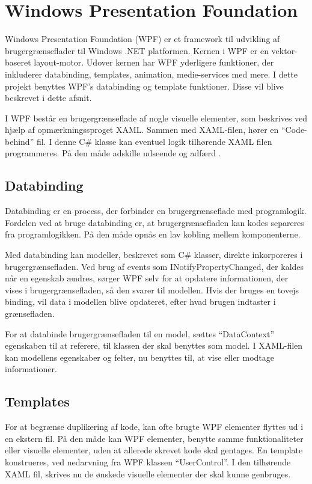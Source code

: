 \section{Windows Presentation Foundation}
\label{sec:wpf}

Windows Presentation Foundation (WPF) er et framework til udvikling af brugergrænseflader til Windows .NET platformen. Kernen i WPF er en vektor-baseret layout-motor. Udover kernen har WPF yderligere funktioner, der inkluderer databinding, templates, animation, medie-services med mere. I dette projekt benyttes WPF's databinding og template funktioner. Disse vil blive beskrevet i dette afsnit.

I WPF består en brugergrænseflade af nogle visuelle elementer, som beskrives ved hjælp af opmærkningssproget XAML. Sammen med XAML-filen, hører en \enquote{Code-behind} fil. I denne C\# klasse kan eventuel logik tilhørende XAML filen programmeres. På den måde adskille udseende og adfærd \cite{microsoft_wpf}.

\subsection{Databinding}

Databinding er en process, der forbinder en brugergrænseflade med programlogik. Fordelen ved at bruge databinding er, at brugergrænsefladen kan kodes separeres fra programlogikken. På den måde opnås en lav kobling mellem komponenterne.

Med databinding kan modeller, beskrevet som C\# klasser, direkte inkorporeres i brugergrænsefladen. Ved brug af events som INotifyPropertyChanged, der kaldes når en egenskab ændres, sørger WPF selv for at opdatere informationen, der vises i brugergrænsefladen, så den svarer til modellen. Hvis der bruges en tovejs binding, vil data i modellen blive opdateret, efter hvad brugen indtaster i grænsefladen.

For at databinde brugergrænsefladen til en model, sættes \enquote{DataContext} egenskaben til at referere, til klassen der skal benyttes som model. I XAML-filen kan modellens egenskaber og felter, nu benyttes til, at vise eller modtage informationer.

\subsection{Templates}

For at begrænse duplikering af kode, kan ofte brugte WPF elementer flyttes ud i en ekstern fil. På den måde kan WPF elementer, benytte samme funktionaliteter eller visuelle elementer, uden at allerede skrevet kode skal gentages. En template konstrueres, ved nedarvning fra WPF klassen \enquote{UserControl}. I den tilhørende XAML fil, skrives nu de ønskede visuelle elementer der skal kunne genbruges.
